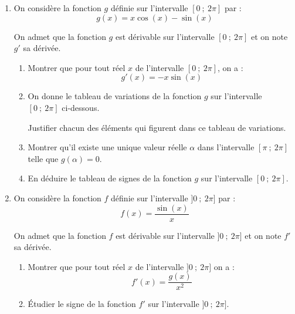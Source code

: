 \begin{enumerate}
\item On considère la fonction $g$ définie sur l'intervalle $[0~;~2\pi]$ par :
\[
g(x)=x\cos(x)-\sin(x)
\]

On admet que la fonction $g$ est dérivable sur l'intervalle $[0~;~2\pi]$ et on note $g'$ sa dérivée.

\begin{enumerate}
\item Montrer que pour tout réel $x$ de l'intervalle $[0~;~2\pi]$, on a :
\[
g'(x)=-x\sin(x)
\]

\item On donne le tableau de variations de la fonction $g$ sur l'intervalle $[0~;~2\pi]$ ci-dessous.

Justifier chacun des éléments qui figurent dans ce tableau de variations.

\begin{center}
\end{center}

\item Montrer qu'il existe une unique valeur réelle $\alpha$ dans l'intervalle $[\pi~;~2\pi]$ telle que $g(\alpha)=0$.

\item En déduire le tableau de signes de la fonction $g$ sur l'intervalle $[0~;~2\pi]$.
\end{enumerate}

\item On considère la fonction $f$ définie sur l'intervalle $]0~;~2\pi]$ par :
\[
f(x)=\dfrac{\sin(x)}{x}
\]

On admet que la fonction $f$ est dérivable sur l'intervalle $]0~;~2\pi]$ et on note $f'$ sa dérivée.

\begin{enumerate}
\item Montrer que pour tout réel $x$ de l'intervalle $]0~;~2\pi]$ on a :
\[
f'(x)=\dfrac{g(x)}{x^2}
\]

\item Étudier le signe de la fonction $f'$ sur l'intervalle $]0~;~2\pi]$.


\end{enumerate}
\end{enumerate}
